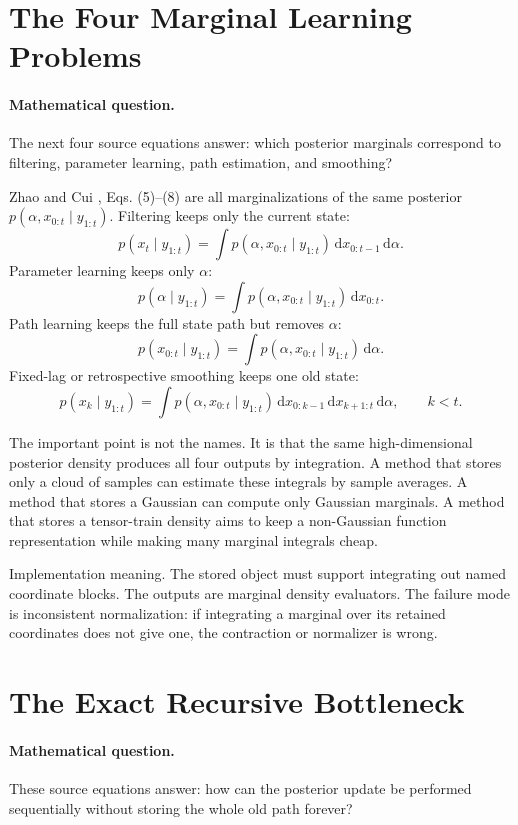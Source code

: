 \documentclass[11pt]{article}
\newcommand{\dd}{\,\mathrm d}
\begin{document}
\section{The Four Marginal Learning Problems}

\paragraph{Mathematical question.}
The next four source equations answer: which posterior marginals correspond to
filtering, parameter learning, path estimation, and smoothing?

Zhao and Cui \cite{zhao2024ttsequential}, Eqs. (5)--(8) are all marginalizations of the same posterior
\(p(\alpha,x_{0:t}\mid y_{1:t})\).  Filtering keeps only the current state:
\[
    p(x_t\mid y_{1:t})
    =
    \int p(\alpha,x_{0:t}\mid y_{1:t})
    \dd x_{0:t-1}\dd\alpha .
    \label{eq:p24-bf-5}
\]
Parameter learning keeps only \(\alpha\):
\[
    p(\alpha\mid y_{1:t})
    =
    \int p(\alpha,x_{0:t}\mid y_{1:t})\dd x_{0:t}.
    \label{eq:p24-bf-6}
\]
Path learning keeps the full state path but removes \(\alpha\):
\[
    p(x_{0:t}\mid y_{1:t})
    =
    \int p(\alpha,x_{0:t}\mid y_{1:t})\dd\alpha .
    \label{eq:p24-bf-7}
\]
Fixed-lag or retrospective smoothing keeps one old state:
\[
    p(x_k\mid y_{1:t})
    =
    \int p(\alpha,x_{0:t}\mid y_{1:t})
    \dd x_{0:k-1}\dd x_{k+1:t}\dd\alpha ,
    \qquad k<t .
    \label{eq:p24-bf-8}
\]

The important point is not the names.  It is that the same high-dimensional
posterior density produces all four outputs by integration.  A method that
stores only a cloud of samples can estimate these integrals by sample averages.
A method that stores a Gaussian can compute only Gaussian marginals.  A method
that stores a tensor-train density aims to keep a non-Gaussian function
representation while making many marginal integrals cheap.

Implementation meaning. The stored object must support
integrating out named coordinate blocks.  The outputs are marginal density
evaluators.  The failure mode is inconsistent normalization: if integrating a
marginal over its retained coordinates does not give one, the contraction or
normalizer is wrong.

\section{The Exact Recursive Bottleneck}

\paragraph{Mathematical question.}
These source equations answer: how can the posterior update be performed
sequentially without storing the whole old path forever?
\end{document}

